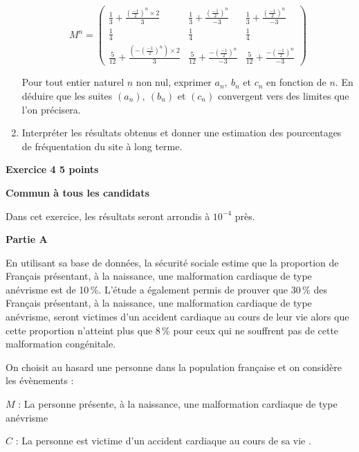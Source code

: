 \documentclass[10pt]{article}
\begin{document}
\begin{enumerate}
\[M^n = \begin{pmatrix}
\frac{1}{3} + \frac{\left( \frac{- 1}{2}\right)^n \times 2}{3}&\frac{1}{3} + \frac{\left( \frac{- 1}{2}\right)^n }{- 3}&\frac{1}{3} + \frac{\left(\frac{- 1}{2}\right)^n}{- 3}\\
\frac{1}{4}&\frac{1}{4}&\frac{1}{4}\\
\frac{5}{12} + \frac{\left(-\left(\frac{- 1}{2}\right)^n\right) \times 2}{3}&\frac{5}{12} + \frac{-\left(\frac{- 1}{2}\right)^n}{-3}&\frac{5}{12} + \frac{-\left(\frac{- 1}{2}\right)^n }{- 3}
\end{pmatrix}\] 

Pour tout entier naturel $n$ non nul, exprimer $a_{n}, \: b_{n}$ et $c_{n}$ en fonction de $n$. En déduire que les suites $\left(a_{n}\right), \: \left(b_{n}\right)$ et $\left(c_{n}\right)$ convergent vers des limites que l'on précisera. 
\item Interpréter les résultats obtenus et donner une estimation des pourcentages de fréquentation du site à long terme. 
\end{enumerate}

\vspace{0,5cm}

\textbf{Exercice 4 \hfill 5 points}

\textbf{Commun à tous les candidats}

\medskip
 
Dans cet exercice, les résultats seront arrondis à $10^{-4}$ près.

\medskip
 
\textbf{Partie A}

\medskip
 
En utilisant sa base de données, la sécurité sociale estime que la proportion de Français présentant, à la naissance, une malformation cardiaque de type anévrisme est de 10\,\%. L'étude a également permis de prouver que 30\,\% des Français présentant, à la naissance, une malformation cardiaque de type anévrisme, seront victimes d'un accident cardiaque au cours de leur vie alors que cette proportion n'atteint plus que 8\,\% pour ceux qui ne souffrent pas de cette malformation congénitale.

\medskip
 
On choisit au hasard une personne dans la population française et on considère les évènements :
 
$M$ : \og La personne présente, à la naissance, une malformation cardiaque de type anévrisme \fg

$C$ : \og La personne est victime d'un accident cardiaque au cours de sa vie \fg.
\end{document}
